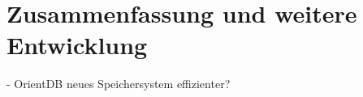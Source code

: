 \chapter{Zusammenfassung und weitere Entwicklung}
\label{cha:Fazit}

- OrientDB neues Speichersystem effizienter?
